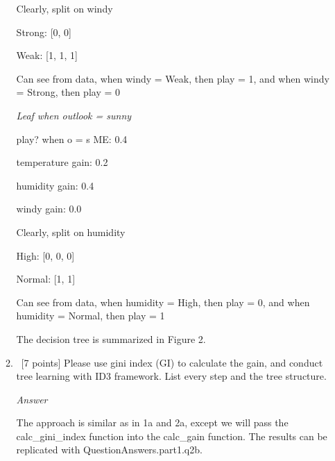 \documentclass[12pt, fullpage,letterpaper]{article}
\begin{document}
\begin{enumerate}
\begin{enumerate}
    \vspace{5mm}
    
    Clearly, split on windy
    
    \vspace{5mm}

    Strong: [0, 0]
    
    Weak: [1, 1, 1]
    
    \vspace{5mm}

    Can see from data, when windy = Weak, then play = 1, and when windy = Strong, then play = 0
    
    \vspace{5mm}
    \emph{Leaf when outlook = sunny}
    
    \vspace{5mm}
    
    play? when o = s ME:  0.4
    
    temperature gain: 0.2
    
    humidity gain: 0.4
    
    windy gain: 0.0
    
    \vspace{5mm}
    
    Clearly, split on humidity
    
    \vspace{5mm}
    
    High: [0, 0, 0]
    
    Normal: [1, 1]

    \vspace{5mm}

    Can see from data, when humidity = High, then play = 0, and when humidity = Normal, then play = 1
    
    \vspace{5mm}
    
    The decision tree is summarized in Figure 2.
	
	\item~[7 points] Please use gini index (GI) to calculate the gain, and conduct tree learning with ID3 framework. List every step and the tree structure.
	
	\emph{Answer}
	
	The approach is similar as in 1a and 2a, except we will pass the calc\_gini\_index function into the calc\_gain function. The results can be replicated with QuestionAnswers.part1.q2b.
	
	\vspace{5mm}
	

\end{enumerate}
\end{enumerate}
\end{document}
